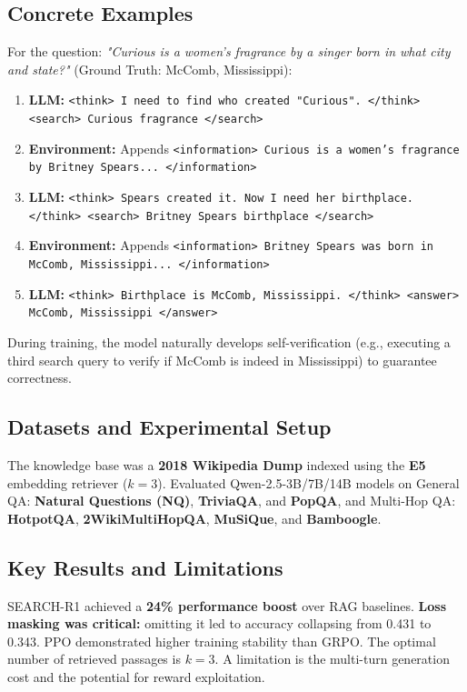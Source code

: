 \documentclass[11pt,a4paper]{article}
\begin{document}
\subsection{Concrete Examples}
For the question: \textit{"Curious is a women's fragrance by a singer born in what city and state?"} (Ground Truth: McComb, Mississippi):
\begin{enumerate}
    \item \textbf{LLM:} \texttt{<think> I need to find who created "Curious". </think> <search> Curious fragrance </search>}
    \item \textbf{Environment:} Appends \texttt{<information> Curious is a women's fragrance by Britney Spears... </information>}
    \item \textbf{LLM:} \texttt{<think> Spears created it. Now I need her birthplace. </think> <search> Britney Spears birthplace </search>}
    \item \textbf{Environment:} Appends \texttt{<information> Britney Spears was born in McComb, Mississippi... </information>}
    \item \textbf{LLM:} \texttt{<think> Birthplace is McComb, Mississippi. </think> <answer> McComb, Mississippi </answer>}
\end{enumerate}
During training, the model naturally develops self-verification (e.g., executing a third search query to verify if McComb is indeed in Mississippi) to guarantee correctness.

\subsection{Datasets and Experimental Setup}
The knowledge base was a \textbf{2018 Wikipedia Dump} indexed using the \textbf{E5} embedding retriever ($k=3$). Evaluated Qwen-2.5-3B/7B/14B models on General QA: \textbf{Natural Questions (NQ)}, \textbf{TriviaQA}, and \textbf{PopQA}, and Multi-Hop QA: \textbf{HotpotQA}, \textbf{2WikiMultiHopQA}, \textbf{MuSiQue}, and \textbf{Bamboogle}.

\subsection{Key Results and Limitations}
SEARCH-R1 achieved a \textbf{24\% performance boost} over RAG baselines. \textbf{Loss masking was critical:} omitting it led to accuracy collapsing from 0.431 to 0.343. PPO demonstrated higher training stability than GRPO. The optimal number of retrieved passages is $k=3$. A limitation is the multi-turn generation cost and the potential for reward exploitation.
\end{document}
